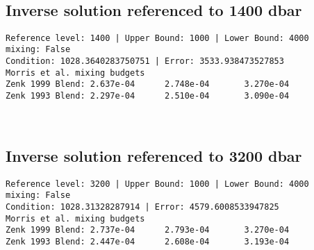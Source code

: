 \documentclass[11pt]{article}
\begin{document}
    \begin{center}
    \end{center}
    { \hspace*{\fill} \\}
    
    \hypertarget{inverse-solution-referenced-to-1400-dbar}{%
\subsection{Inverse solution referenced to 1400
dbar}\label{inverse-solution-referenced-to-1400-dbar}}

    \begin{Verbatim}[commandchars=\\\{\}]
Reference level: 1400 | Upper Bound: 1000 | Lower Bound: 4000
mixing: False
Condition: 1028.3640283750751 | Error: 3533.938473527853
Morris et al. mixing budgets
Zenk 1999 Blend: 2.637e-04      2.748e-04       3.270e-04
Zenk 1993 Blend: 2.297e-04      2.510e-04       3.090e-04
    \end{Verbatim}

    \begin{center}
    \end{center}
    { \hspace*{\fill} \\}
    
    \hypertarget{inverse-solution-referenced-to-3200-dbar}{%
\subsection{Inverse solution referenced to 3200
dbar}\label{inverse-solution-referenced-to-3200-dbar}}

    \begin{Verbatim}[commandchars=\\\{\}]
Reference level: 3200 | Upper Bound: 1000 | Lower Bound: 4000
mixing: False
Condition: 1028.31328287914 | Error: 4579.6008533947825
Morris et al. mixing budgets
Zenk 1999 Blend: 2.737e-04      2.793e-04       3.270e-04
Zenk 1993 Blend: 2.447e-04      2.608e-04       3.193e-04
    \end{Verbatim}

    \begin{center}
    \end{center}
    { \hspace*{\fill} \\}
    
\end{document}
